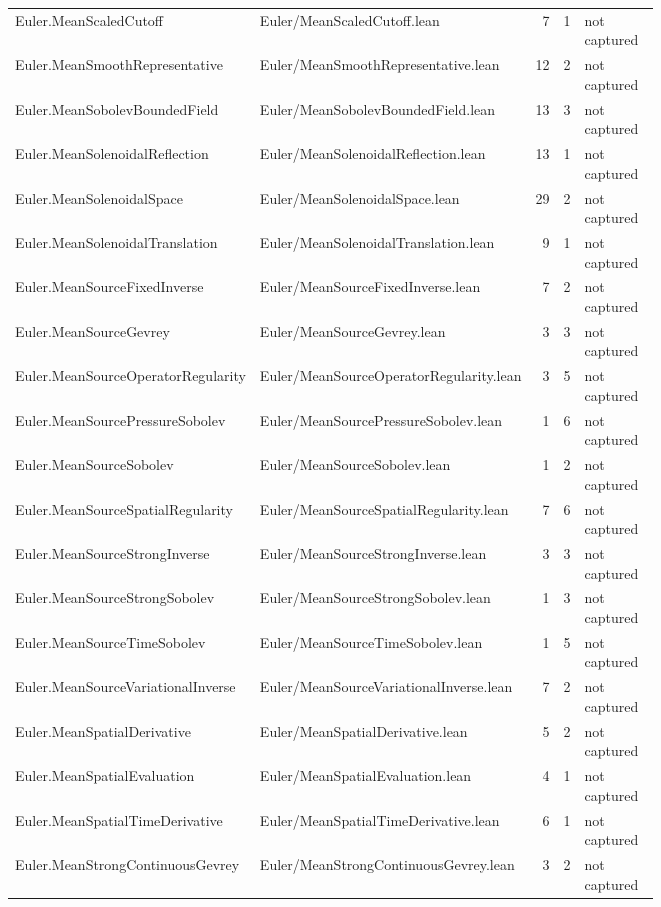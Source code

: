 \documentclass[10pt]{article}
\begin{document}
\begin{longtable}{p{0.28\linewidth}p{0.27\linewidth}r r p{0.20\linewidth}}
Euler.MeanScaledCutoff & Euler/MeanScaledCutoff.lean & 7 & 1 & not captured\\
Euler.MeanSmoothRepresentative & Euler/MeanSmoothRepresentative.lean & 12 & 2 & not captured\\
Euler.MeanSobolevBoundedField & Euler/MeanSobolevBoundedField.lean & 13 & 3 & not captured\\
Euler.MeanSolenoidalReflection & Euler/MeanSolenoidalReflection.lean & 13 & 1 & not captured\\
Euler.MeanSolenoidalSpace & Euler/MeanSolenoidalSpace.lean & 29 & 2 & not captured\\
Euler.MeanSolenoidalTranslation & Euler/MeanSolenoidalTranslation.lean & 9 & 1 & not captured\\
Euler.MeanSourceFixedInverse & Euler/MeanSourceFixedInverse.lean & 7 & 2 & not captured\\
Euler.MeanSourceGevrey & Euler/MeanSourceGevrey.lean & 3 & 3 & not captured\\
Euler.MeanSourceOperatorRegularity & Euler/MeanSourceOperatorRegularity.lean & 3 & 5 & not captured\\
Euler.MeanSourcePressureSobolev & Euler/MeanSourcePressureSobolev.lean & 1 & 6 & not captured\\
Euler.MeanSourceSobolev & Euler/MeanSourceSobolev.lean & 1 & 2 & not captured\\
Euler.MeanSourceSpatialRegularity & Euler/MeanSourceSpatialRegularity.lean & 7 & 6 & not captured\\
Euler.MeanSourceStrongInverse & Euler/MeanSourceStrongInverse.lean & 3 & 3 & not captured\\
Euler.MeanSourceStrongSobolev & Euler/MeanSourceStrongSobolev.lean & 1 & 3 & not captured\\
Euler.MeanSourceTimeSobolev & Euler/MeanSourceTimeSobolev.lean & 1 & 5 & not captured\\
Euler.MeanSourceVariationalInverse & Euler/MeanSourceVariationalInverse.lean & 7 & 2 & not captured\\
Euler.MeanSpatialDerivative & Euler/MeanSpatialDerivative.lean & 5 & 2 & not captured\\
Euler.MeanSpatialEvaluation & Euler/MeanSpatialEvaluation.lean & 4 & 1 & not captured\\
Euler.MeanSpatialTimeDerivative & Euler/MeanSpatialTimeDerivative.lean & 6 & 1 & not captured\\
Euler.MeanStrongContinuousGevrey & Euler/MeanStrongContinuousGevrey.lean & 3 & 2 & not captured\\

\end{longtable}
\end{document}
